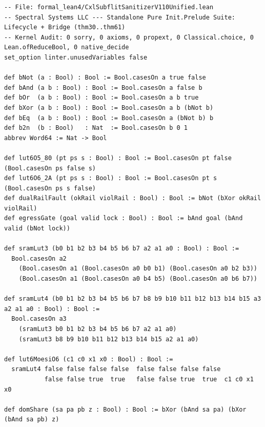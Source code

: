 \documentclass[11pt,letterpaper]{article}
\theoremstyle{spectralthm}
\begin{document}
\begin{lstlisting}[language=Lean4,caption={Standalone Pure Init.Prelude Term-Mode Lean 4 Kernel Suite (thm30--thm61, v0.0.0, 0 sorry, 0 axioms).},label={lst:lean_unified}]
-- File: formal_lean4/CxlSubflitSanitizerV110Unified.lean
-- Spectral Systems LLC --- Standalone Pure Init.Prelude Suite: Lifecycle + Bridge (thm30..thm61)
-- Kernel Audit: 0 sorry, 0 axioms, 0 propext, 0 Classical.choice, 0 Lean.ofReduceBool, 0 native_decide
set_option linter.unusedVariables false

def bNot (a : Bool) : Bool := Bool.casesOn a true false
def bAnd (a b : Bool) : Bool := Bool.casesOn a false b
def bOr  (a b : Bool) : Bool := Bool.casesOn a b true
def bXor (a b : Bool) : Bool := Bool.casesOn a b (bNot b)
def bEq  (a b : Bool) : Bool := Bool.casesOn a (bNot b) b
def b2n  (b : Bool)   : Nat  := Bool.casesOn b 0 1
abbrev Word64 := Nat -> Bool

def lut6O5_80 (pt ps s : Bool) : Bool := Bool.casesOn pt false (Bool.casesOn ps false s)
def lut6O6_2A (pt ps s : Bool) : Bool := Bool.casesOn pt s (Bool.casesOn ps s false)
def dualRailFault (okRail violRail : Bool) : Bool := bNot (bXor okRail violRail)
def egressGate (goal valid lock : Bool) : Bool := bAnd goal (bAnd valid (bNot lock))

def sramLut3 (b0 b1 b2 b3 b4 b5 b6 b7 a2 a1 a0 : Bool) : Bool :=
  Bool.casesOn a2
    (Bool.casesOn a1 (Bool.casesOn a0 b0 b1) (Bool.casesOn a0 b2 b3))
    (Bool.casesOn a1 (Bool.casesOn a0 b4 b5) (Bool.casesOn a0 b6 b7))

def sramLut4 (b0 b1 b2 b3 b4 b5 b6 b7 b8 b9 b10 b11 b12 b13 b14 b15 a3 a2 a1 a0 : Bool) : Bool :=
  Bool.casesOn a3
    (sramLut3 b0 b1 b2 b3 b4 b5 b6 b7 a2 a1 a0)
    (sramLut3 b8 b9 b10 b11 b12 b13 b14 b15 a2 a1 a0)

def lut6MoesiO6 (c1 c0 x1 x0 : Bool) : Bool :=
  sramLut4 false false false false  false false false false
           false false true  true   false false true  true  c1 c0 x1 x0

def domShare (sa pa pb z : Bool) : Bool := bXor (bAnd sa pa) (bXor (bAnd sa pb) z)


\end{lstlisting}
\end{document}
